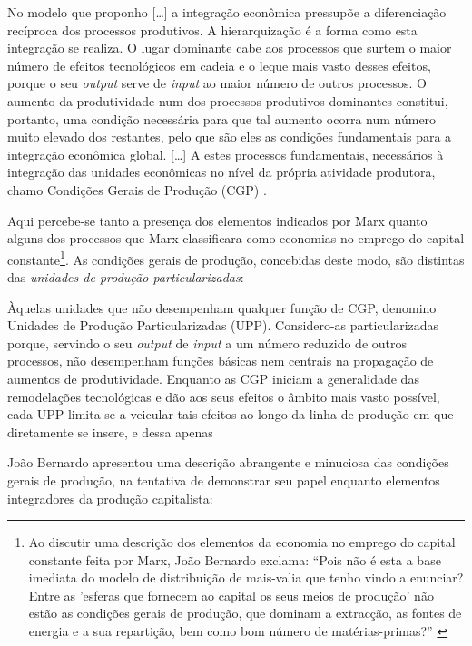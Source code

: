 \begin{citacao}
No modelo que proponho [\dots] a integração econômica pressupõe a diferenciação recíproca dos processos produtivos. A hierarquização é a forma como esta integração se realiza. O lugar dominante cabe aos processos que surtem o maior número de efeitos tecnológicos em cadeia e o leque mais vasto desses efeitos, porque o seu \textit{output} serve de \textit{input} ao maior número de outros processos. O aumento da produtividade num dos processos produtivos dominantes constitui, portanto, uma condição necessária para que tal aumento ocorra num número muito elevado dos restantes, pelo que são eles as condições fundamentais para a integração econômica global. [\dots] A estes processos fundamentais, necessários à integração das unidades econômicas no nível da própria atividade produtora, chamo Condições Gerais de Produção (CGP) \cite[p.~157-158]{BERNARDO1991}.
\end{citacao}

Aqui percebe-se tanto a presença dos elementos indicados por Marx quanto alguns dos processos que Marx classificara como economias no emprego do capital constante\footnote{Ao discutir uma descrição dos elementos da economia no emprego do capital constante feita por Marx, João Bernardo exclama: ``Pois não é esta a base imediata do modelo de distribuição de mais-valia que tenho vindo a enunciar? Entre as 'esferas que fornecem ao capital os seus meios de produção' não estão as condições gerais de produção, que dominam a extracção, as fontes de energia e a sua repartição, bem como bom número de matérias-primas?'' \cite[p.~114]{BERNARDO1977b}}. As condições gerais de produção, concebidas deste modo, são distintas das \textit{unidades de produção particularizadas}:

\begin{citacao}
Àquelas unidades que não desempenham qualquer função de CGP, denomino Unidades de Produção Particularizadas (UPP). Considero-as particularizadas porque, servindo o seu \textit{output} de \textit{input} a um número reduzido de outros processos, não desempenham funções básicas nem centrais na propagação de aumentos de produtividade. Enquanto as CGP iniciam a generalidade das remodelações tecnológicas e dão aos seus efeitos o âmbito mais vasto possível, cada UPP limita-se a veicular tais efeitos ao longo da linha de produção em que diretamente se insere, e dessa apenas \cite[p.~158]{BERNARDO1991} 
\end{citacao}

João Bernardo apresentou uma descrição abrangente e minuciosa das condições gerais de produção, na tentativa de demonstrar seu papel enquanto elementos integradores da produção capitalista:

